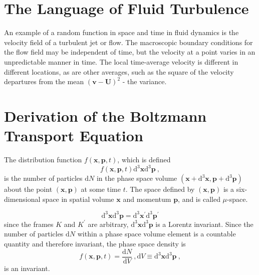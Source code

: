 \documentclass[12pt,a4paper]{article}
\renewcommand{\vec}[1]{\boldsymbol{#1}}
\newcommand{\dif}{\mathrm{d}}
\begin{document}
\section{The Language of Fluid Turbulence}
An example of a random function in space and time in fluid dynamics is the velocity field of a turbulent jet or flow. The macroscopic boundary conditions for the flow field may be independent of time, but the velocity at a point varies in an unpredictable manner in time. The local time-average velocity is different in different locations, as are other averages, such as the square of the velocity departures from the mean $(\vec{v}- \vec{U})^2$ - the variance.















































\section{Derivation of the Boltzmann Transport Equation}
The distribution function $f(\vec{x}, \vec{p}, t)$, which is defined 
\begin{equation}
f(\vec{x}, \vec{p}, t) \dif^3 \vec{x} \dif^3 \vec{p} ~,
\end{equation}
is the number of particles $\dif N$ in the phase space volume $(\vec{x} + \dif^3 \vec{x}, \vec{p} +\dif^3 \vec{p})$ about the point $(\vec{x}, \vec{p})$ at some time $t$. The space defined by $(\vec{x}, \vec{p})$ is a six-dimensional space in spatial volume $\vec{x}$ and momentum $\vec{p}$, and is called $\mu$-space. 



\begin{equation}
\dif^3 \vec{x} \dif^3 \vec{p} = \dif^3 \vec{x}^\prime \dif^3 \vec{p}^\prime
\end{equation}
since the frames $K$ and $K^\prime$ are arbitrary,  $\dif^3 \vec{x} \dif^3 \vec{p}$ is a Lorentz invariant. Since the number of particles $\dif N$ within a phase space volume element is a countable quantity and therefore invariant, the phase space density is
\begin{equation}
f(\vec{x}, \vec{p}, t) = \dfrac{\dif N}{\dif V} ~, \dif V \equiv \dif^3 \vec{x} \dif^3 \vec{p} ~, 
\end{equation}
is an invariant.
\end{document}
